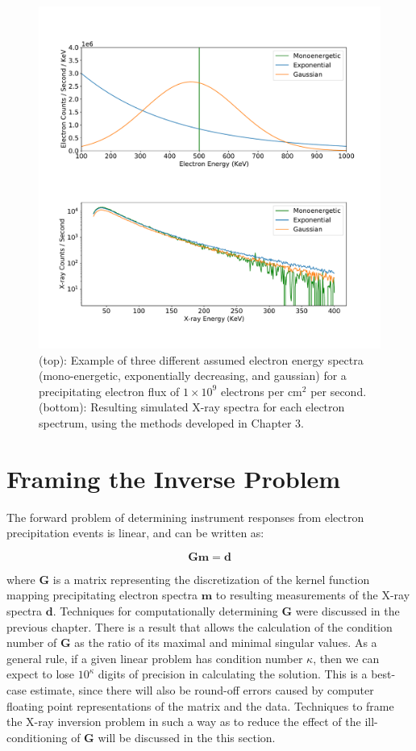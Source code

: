 \begin{figure}[p]
\label{why_ill_conditioned}
\centering
\includegraphics[width=1.0\textwidth]{figures/chapter_4/why_ill_conditioned/fig.pdf}
\caption{(top): Example of three different assumed electron energy spectra (mono-energetic, exponentially decreasing, and gaussian) for a precipitating electron flux of $1\times10^9$ electrons per $\mbox{cm}^2$ per second. (bottom): Resulting simulated X-ray spectra for each electron spectrum, using the methods developed in Chapter 3.} 
\end{figure}

\section{Framing the Inverse Problem}

The forward problem of determining instrument responses from electron precipitation events is linear, and can be written as:

$$\mathbf{G}\mathbf{m} = \mathbf{d}$$

where $\mathbf{G}$ is a matrix representing the discretization of the kernel function mapping precipitating electron spectra $\mathbf{m}$ to resulting measurements of the X-ray spectra $\mathbf{d}$. Techniques for computationally determining $\mathbf{G}$ were discussed in the previous chapter. There is a result that allows the calculation of the condition number of $\mathbf{G}$ as the ratio of its maximal and minimal singular values. As a general rule, if a given linear problem has condition number $\kappa$, then we can expect to lose $10^\kappa$ digits of precision in calculating the solution. This is a best-case estimate, since there will also be round-off errors caused by computer floating point representations of the matrix and the data. Techniques to frame the X-ray inversion problem in such a way as to reduce the effect of the ill-conditioning  of $\mathbf{G}$ will be discussed in the this section.

